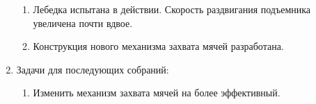 \begin{enumerate}
\begin{enumerate}
		\item Лебедка испытана в действии. Скорость раздвигания подъемника увеличена почти вдвое.
		
		\item Конструкция нового механизма захвата мячей разработана.
		
	\end{enumerate}
	
	\item Задачи для последующих собраний:
	\begin{enumerate}
		\item Изменить механизм захвата мячей на более эффективный.
		
	\end{enumerate}     
\end{enumerate}
\fillpage